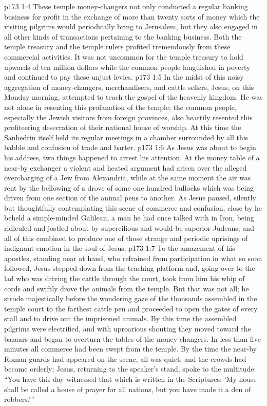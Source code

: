 \vs p173 1:4 These temple money\hyp{}changers not only conducted a regular banking business for profit in the exchange of more than twenty sorts of money which the visiting pilgrims would periodically bring to Jerusalem, but they also engaged in all other kinds of transactions pertaining to the banking business. Both the temple treasury and the temple rulers profited tremendously from these commercial activities. It was not uncommon for the temple treasury to hold upwards of ten million dollars while the common people languished in poverty and continued to pay these unjust levies.
\vs p173 1:5 \pc In the midst of this noisy aggregation of money\hyp{}changers, merchandisers, and cattle sellers, Jesus, on this Monday morning, attempted to teach the gospel of the heavenly kingdom. He was not alone in resenting this profanation of the temple; the common people, especially the Jewish visitors from foreign provinces, also heartily resented this profiteering desecration of their national house of worship. At this time the Sanhedrin itself held its regular meetings in a chamber surrounded by all this babble and confusion of trade and barter.
\vs p173 1:6 As Jesus was about to begin his address, two things happened to arrest his attention. At the money table of a near\hyp{}by exchanger a violent and heated argument had arisen over the alleged overcharging of a Jew from Alexandria, while at the same moment the air was rent by the bellowing of a drove of some one hundred bullocks which was being driven from one section of the animal pens to another. As Jesus paused, silently but thoughtfully contemplating this scene of commerce and confusion, close by he beheld a simple\hyp{}minded Galilean, a man he had once talked with in Iron, being ridiculed and jostled about by supercilious and would\hyp{}be superior Judeans; and all of this combined to produce one of those strange and periodic uprisings of indignant emotion in the soul of Jesus.
\vs p173 1:7 To the amazement of his apostles, standing near at hand, who refrained from participation in what so soon followed, Jesus stepped down from the teaching platform and, going over to the lad who was driving the cattle through the court, took from him his whip of cords and swiftly drove the animals from the temple. But that was not all; he strode majestically before the wondering gaze of the thousands assembled in the temple court to the farthest cattle pen and proceeded to open the gates of every stall and to drive out the imprisoned animals. By this time the assembled pilgrims were electrified, and with uproarious shouting they moved toward the bazaars and began to overturn the tables of the money\hyp{}changers. In less than five minutes all commerce had been swept from the temple. By the time the near\hyp{}by Roman guards had appeared on the scene, all was quiet, and the crowds had become orderly; Jesus, returning to the speaker’s stand, spoke to the multitude: \textcolor{ubdarkred}{“You have this day witnessed that which is written in the Scriptures: ‘My house shall be called a house of prayer for all nations, but you have made it a den of robbers.’”}
